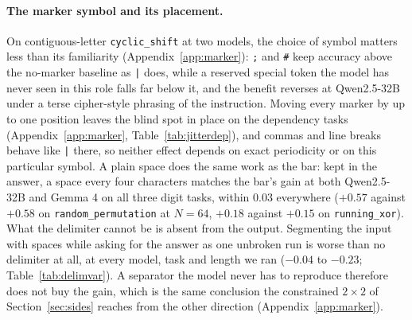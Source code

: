 \documentclass[10pt]{article} %
\newcommand{\task}[1]{\texttt{#1}}
\begin{document}
\paragraph{The marker symbol and its placement.} On contiguous-letter \task{cyclic\_shift} at two models, the choice of symbol matters less than its familiarity (Appendix~\ref{app:marker}): \texttt{;} and \texttt{\#} keep accuracy above the no-marker baseline as \texttt{|} does, while a reserved special token the model has never seen in this role falls far below it, and the benefit reverses at Qwen2.5-32B under a terse cipher-style phrasing of the instruction. Moving every marker by up to one position leaves the blind spot in place on the dependency tasks (Appendix~\ref{app:marker}, Table~\ref{tab:jitterdep}), and commas and line breaks behave like \texttt{|} there, so neither effect depends on exact periodicity or on this particular symbol. A plain space does the same work as the bar: kept in the answer, a space every four characters matches the bar's gain at both Qwen2.5-32B and Gemma 4 on all three digit tasks, within 0.03 everywhere ($+0.57$ against $+0.58$ on \task{random\_permutation} at $N = 64$, $+0.18$ against $+0.15$ on \task{running\_xor}). What the delimiter cannot be is absent from the output. Segmenting the input with spaces while asking for the answer as one unbroken run is worse than no delimiter at all, at every model, task and length we ran ($-0.04$ to $-0.23$; Table~\ref{tab:delimvar}). A separator the model never has to reproduce therefore does not buy the gain, which is the same conclusion the constrained $2 \times 2$ of Section~\ref{sec:sides} reaches from the other direction (Appendix~\ref{app:marker}).
\end{document}
